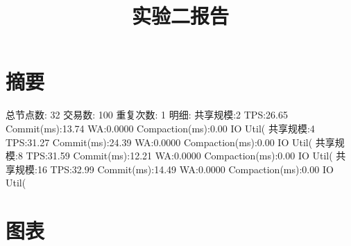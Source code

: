 \documentclass{ctexart}
\title{实验二报告}
\date{}
\begin{document}
\maketitle
\section*{摘要}
总节点数: 32
交易数: 100
重复次数: 1
明细:
共享规模:2 TPS:26.65 Commit(ms):13.74 WA:0.0000 Compaction(ms):0.00 IO Util(%
共享规模:4 TPS:31.27 Commit(ms):24.39 WA:0.0000 Compaction(ms):0.00 IO Util(%
共享规模:8 TPS:31.59 Commit(ms):12.21 WA:0.0000 Compaction(ms):0.00 IO Util(%
共享规模:16 TPS:32.99 Commit(ms):14.49 WA:0.0000 Compaction(ms):0.00 IO Util(%
\section*{图表}
\end{document}
